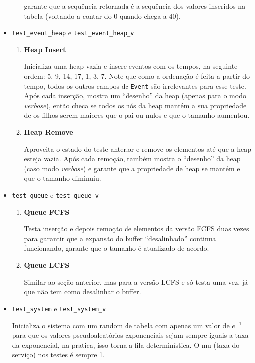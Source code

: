 \documentclass[a4paper]{article}
\newcommand{\inlcode}{\texttt}
\begin{document}
\begin{itemize}
\begin{enumerate}
                garante que a sequência retornada é
                a sequência dos valores inseridos na tabela
                (voltando a contar do 0 quando chega a 40).
        \end{enumerate}
    \item \inlcode{test\_event\_heap} e \inlcode{test\_event\_heap\_v}
        \begin{enumerate}
            \item \textbf{Heap Insert} \par
                Inicializa uma heap vazia e
                insere eventos com os tempos,
                na seguinte ordem: 5, 9, 14, 17, 1, 3, 7.
                Note que como a ordenação é feita a partir do tempo,
                todos os outros campos de \inlcode{Event}
                são irrelevantes para esse teste.
                Após cada inserção, mostra um ``desenho'' da heap
                (apenas para o modo \emph{verbose}),
                então checa se todos os nós da heap mantém
                a sua propriedade de os filhos serem maiores
                que o pai ou nulos
                e que o tamanho aumentou.
            \item \textbf{Heap Remove} \par
                Aproveita o estado do teste anterior
                e remove os elementos até que a heap esteja vazia.
                Após cada remoção, também
                mostra o ``desenho'' da heap
                (caso modo \emph{verbose})
                e garante que a propriedade de heap se mantém
                e que o tamanho diminuiu.
        \end{enumerate}
    \item \inlcode{test\_queue} e \inlcode{test\_queue\_v}
        \begin{enumerate}
            \item \textbf{Queue FCFS} \par
                Testa inserção e depois remoção de elementos
                da versão FCFS
                duas vezes para garantir
                que a expansão do buffer ``desalinhado''
                continua funcionando,
                garante que o tamanho é atualizado de acordo.
            \item \textbf{Queue LCFS} \par
                Similar ao seção anterior,
                mas para a versão LCFS
                e só testa uma vez,
                já que não tem como desalinhar o buffer.
        \end{enumerate}
    \item \inlcode{test\_system} e \inlcode{test\_system\_v} \par
        Inicializa o sistema com um random de tabela com
        apenas um valor de \(e^{-1}\) para que
        os valores pseudoaleatórios exponenciais
        sejam sempre iguais a taxa da exponencial,
        na pratica, isso torna a fila determinística.
        O mu (taxa do serviço) nos testes é sempre 1.


\end{itemize}
\end{document}
